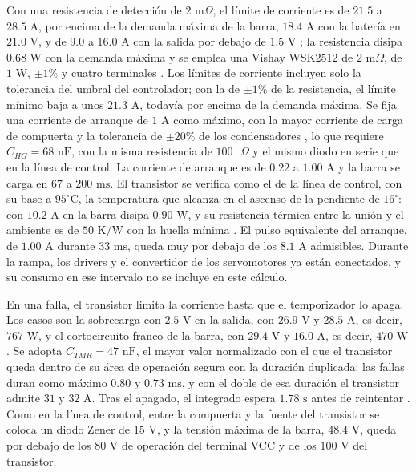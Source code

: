 \documentclass[../../General.tex]{subfiles}
\begin{document}
Con una resistencia de detección de $2\text{ m}\Omega$, el límite de corriente es de $21.5$ a $28.5\text{ A}$, por encima de la demanda máxima de la barra, $18.4\text{ A}$ con la batería en $21.0\text{ V}$, y de $9.0$ a $16.0\text{ A}$ con la salida por debajo de $1.5\text{ V}$ \citep{adi_ltc4364}; la resistencia disipa $0.68\text{ W}$ con la demanda máxima y se emplea una Vishay WSK2512 de $2\text{ m}\Omega$, de $1\text{ W}$, $\pm 1\%$ y cuatro terminales \citep{vishay_wsk2512}. Los límites de corriente incluyen solo la tolerancia del umbral del controlador; con la de $\pm 1\%$ de la resistencia, el límite mínimo baja a unos $21.3\text{ A}$, todavía por encima de la demanda máxima. Se fija una corriente de arranque de $1\text{ A}$ como máximo, con la mayor corriente de carga de compuerta y la tolerancia de $\pm 20\%$ de los condensadores \citep{samxon_gt}, lo que requiere $C_{HG} = 68\text{ nF}$, con la misma resistencia de $100\text{ }\Omega$ y el mismo diodo en serie que en la línea de control. La corriente de arranque es de $0.22$ a $1.00\text{ A}$ y la barra se carga en $67$ a $200\text{ ms}$. El transistor se verifica como el de la línea de control, con su base a $95^\circ\text{C}$, la temperatura que alcanza en el ascenso de la pendiente de $16^\circ$: con $10.2\text{ A}$ en la barra disipa $0.90\text{ W}$, y su resistencia térmica entre la unión y el ambiente es de $50\text{ K/W}$ con la huella mínima \citep{nexperia_psmn4r8}. El pulso equivalente del arranque, de $1.00\text{ A}$ durante $33\text{ ms}$, queda muy por debajo de los $8.1\text{ A}$ admisibles. Durante la rampa, los drivers y el convertidor de los servomotores ya están conectados, y su consumo en ese intervalo no se incluye en este cálculo.

En una falla, el transistor limita la corriente hasta que el temporizador lo apaga. Los casos son la sobrecarga con $2.5\text{ V}$ en la salida, con $26.9\text{ V}$ y $28.5\text{ A}$, es decir, $767\text{ W}$, y el cortocircuito franco de la barra, con $29.4\text{ V}$ y $16.0\text{ A}$, es decir, $470\text{ W}$. Se adopta $C_{TMR} = 47\text{ nF}$, el mayor valor normalizado con el que el transistor queda dentro de su área de operación segura con la duración duplicada: las fallas duran como máximo $0.80$ y $0.73\text{ ms}$, y con el doble de esa duración el transistor admite $31$ y $32\text{ A}$. Tras el apagado, el integrado espera $1.78\text{ s}$ antes de reintentar \citep{adi_ltc4364}. Como en la línea de control, entre la compuerta y la fuente del transistor se coloca un diodo Zener de $15\text{ V}$, y la tensión máxima de la barra, $48.4\text{ V}$, queda por debajo de los $80\text{ V}$ de operación del terminal VCC \citep{adi_ltc4364} y de los $100\text{ V}$ del transistor.
\end{document}
